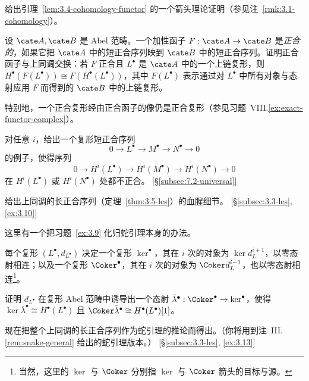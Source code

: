 \begin{prob}\label{ex:3.6}
给出引理~\ref{lem:3.4-cohomology-functor} 的一个箭头理论证明（参见注~\ref{rmk:3.1-cohomology}）。
\end{prob}

\begin{prob}\label{ex:3.7}
设 $\cate A,\cate B$ 是 Abel 范畴。一个加性函子 $F:\cate A\to\cate B$ 是\emph{正合的}，如果它把 $\cate A$ 中的短正合序列映到 $\cate B$ 中的短正合序列。证明正合函子与上同调交换：若 $F$ 正合且 $L^\bullet$ 是 $\cate A$ 中的一个上链复形，则 $H^\bullet(F(L^\bullet))\cong F(H^\bullet(L^\bullet))$，其中 $F(L^\bullet)$ 表示通过对 $L^\bullet$ 中所有对象与态射应用 $F$ 而得到的 $\cate B$ 中的上链复形。

特别地，一个正合复形经由正合函子的像仍是正合复形（参见习题~VIII.\ref{ex:exact-functor-complex}）。
\end{prob}

\begin{prob}\label{ex:3.8}
对任意 $i$，给出一个复形短正合序列
\[
0\longrightarrow L^\bullet\longrightarrow M^\bullet\longrightarrow N^\bullet\longrightarrow 0
\]
的例子，使得序列
\[
0\longrightarrow H^i(L^\bullet)\longrightarrow H^i(M^\bullet)\longrightarrow H^i(N^\bullet)\longrightarrow 0
\]
在 $H^i(L^\bullet)$ 或 $H^i(N^\bullet)$ 处都不正合。 [\S\ref{subsec:7.2-universal}]
\end{prob}

\begin{prob}\label{ex:3.9}
给出上同调的长正合序列（定理~\ref{thm:3.5-les}）的血腥细节。 [\S\ref{subsec:3.3-les}, \ref{ex:3.10}]
\end{prob}

\begin{prob}\label{ex:3.10}
这里有一个把习题~\ref{ex:3.9} 化归蛇引理本身的办法。

每个复形 $(L^\bullet, d_{L^\bullet})$ 决定一个复形 $\ker^\bullet$，其在 $i$ 次的对象为 $\ker d_L^{i+1}$，以零态射相连；以及一个复形 $\Coker^\bullet$，其在 $i$ 次的对象为 $\Coker d_L^{i-1}$，也以零态射相连\footnote{当然，这里的 $\ker$ 与 $\Coker$ 分别指 $\ker$ 与 $\Coker$ 箭头的目标与源。}。

证明 $d_{L^\bullet}$ 在复形 Abel 范畴中诱导出一个态射 $\bar\lambda^\bullet:\Coker^\bullet\to\ker^\bullet$，使得 $\ker\bar\lambda^\bullet\cong H^\bullet(L^\bullet)$ 且 $\Coker\bar\lambda^\bullet\cong H^\bullet(L^\bullet)[1]$。

现在把整个上同调的长正合序列作为蛇引理的推论而得出。（你将用到注~III.\ref{rem:snake-general} 给出的蛇引理版本。） [\S\ref{subsec:3.3-les}, \ref{ex:3.13}]
\end{prob}

